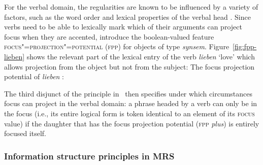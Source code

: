 \documentclass[output=paper]{langsci/langscibook}
\begin{document}
For the verbal domain, the regularities are known to be influenced by
a variety of factors, such as the word order and lexical properties of
the verbal head \citep[cf., e.g., ][]{vSU86a}.  Since verbs
need to be able to lexically mark which of their arguments can project
focus when they are accented, \cite{dKM2003a} introduce the boolean-valued feature
\textsc{focus"=projection"=potential (fpp)} for objects of type
\textit{synsem}.  Figure~\ref{fig:fpp-lieben} shows the relevant part
of the lexical entry of the verb \textit{lieben} `love' which allows
projection from the object but not from the subject:
\ea
The focus projection potential of \textit{lieben} \citep{dKM2003a}:
\begin{center}
  \begin{avm}
  \end{avm}
\label{fig:fpp-lieben}
\end{center}\unskip
\z
The third disjunct of the principle in~ then specifies under which circumstances
focus can project in the verbal domain: a phrase headed by a verb can
only be in the focus (i.e., its entire logical form is token identical
to an element of its \textsc{focus} value) if the daughter that has the focus
projection potential (\textsc{fpp} \textit{plus}) is entirely focused
itself.


\subsubsection{Information structure principles in MRS}
\end{document}
